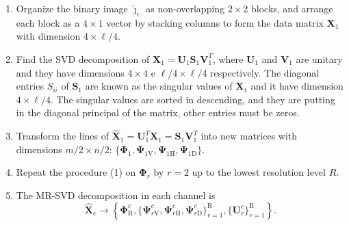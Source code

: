 \documentclass[journal]{IEEEtran}
\begin{document}
\begin{enumerate}
\item Organize the binary image $\bm{\widehat\jmath}_c$ as non-overlapping $2\times 2$ blocks, and arrange each block as a $4\times 1$ vector by stacking columns to form the data matrix $\bm X_1$ with dimension ${4\times{\ell}/{4}}$.
\item Find the SVD decomposition
 of $\bm X_1=\bm U_1 \bm S_1 \bm V_1^T$, where $\bm U_1$ and $\bm V_1$ are  unitary and they have dimensions ${4\times 4}$ e ${\ell}/{4}\times{\ell}/{4}$ respectively. The diagonal entries $S_{ii}$ of $\bm S_1$ are known as the singular values of $\bm X_1$ and it have dimension $4\times{\ell}/{4}$. The singular values are sorted in descending, and they are putting in the diagonal principal of the matrix, other entries must be zeros. 
\item 
Transform the lines of $\widehat{\bm X}_1=\bm U_1^T\bm X_1=\bm S_1 \bm V_1^T$ into new matrices with dimensions ${m}/{2}\times{n}/{2}$: $\{\bm\Phi_1, \bm\Psi_{1\text{V}}, \bm\Psi_{1\text{H}}, \bm\Psi_{1\text{D}}\}$. 
\item Repeat the procedure (1) on $\bm\Phi_r$ by $r=2$ up to the lowest resolution level $R$. 
\item The MR-SVD decomposition in each channel is
\begin{equation}\nonumber
\widehat{\bm X}_c\rightarrow \left\{\bm \Phi_\text{R}^c,\{\bm\Psi_{r\text{V}}^c,\bm\Psi_{r\text{H}}^c,\bm\Psi_{r\text{D}}^c \}_{r=1}^\text{R},\{\bm U_r^c	\}_{r=1}^\text{R} \right\}.

\end{equation}
\end{enumerate}
\end{document}
